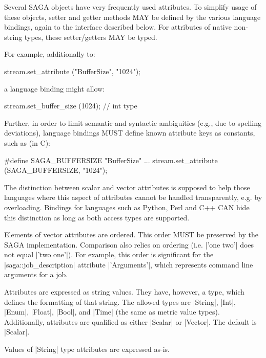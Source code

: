  Several SAGA objects have very frequently used attributes.  To
  simplify usage of these objects, setter and getter methods MAY
  be defined by the various language bindings, again
   to the interface described below.  For
  attributes of native non-string types, these setter/getters
  MAY be typed.
 
  For example, additionally to:
 
  \up
  \begin{myio}
    stream.set_attribute ("BufferSize", "1024");
  \end{myio}
 
  \up
  a language binding might allow:
 
  \up
  \begin{myio}
    stream.set_buffer_size (1024);  // int type
  \end{myio}
 
  \up
  Further, in order to limit semantic and syntactic ambiguities
  (e.g., due to spelling deviations), language bindings MUST
  define known attribute keys as constants, such as (in C):
 
  \up
  \begin{myio}
    #define SAGA_BUFFERSIZE "BufferSize"
    ...
    stream.set_attribute (SAGA_BUFFERSIZE, "1024");
  \end{myio}
  
  \up
  The distinction between scalar and vector attributes is
  supposed to help those
  languages where this aspect of attributes cannot
  be handled transparently, e.g. by overloading.  Bindings for languages
  such as Python, Perl and C++ CAN hide this distinction as long
  as both access types are supported.
 
  Elements of vector attributes are ordered. This order MUST be 
  preserved by the SAGA implementation.
  Comparison also relies on ordering (i.e. |'one two'| does
  not equal |'two one'|).  For example, this order is
  significant for the |saga::job_description| attribute
  |'Arguments'|, which represents command line arguments for a
  job.
 
  Attributes are expressed as string values. They have,
  however, a type, which defines the formatting of that
  string.  The allowed types are |String|, |Int|, |Enum|,
  |Float|, |Bool|, and |Time| (the same as metric value types).
  Additionally, attributes are qualified as either |Scalar| or
  |Vector|.  The default is |Scalar|.
 
  Values of |String| type attributes are expressed as-is.
 
